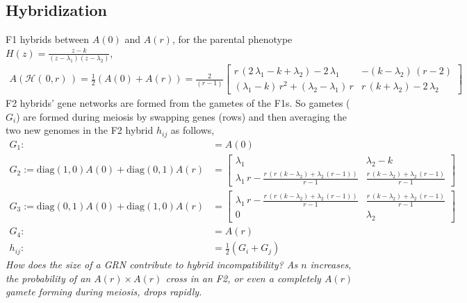 \documentclass[11 pt]{article}
\newcommand{\jss}[1]{{\color{olive}\it #1}}
\newcommand{\1}{\mathbbm{1}}
\begin{document}
      \subsection{Hybridization}
       F1 hybrids between $A(0)$ and $A(r)$, for the parental phenotype $H(z) = \displaystyle\frac{z-k}{\left(z-\lambda_{1}\right)\left(z-\lambda_{2}\right)}$,
      \begin{align*}
        A\left(\mathcal{H}(\, 0,r)\, \right) = \frac{1}{2} \left( A(0) + A(r) \right) = \frac{2}{(r-1)} \left[\begin{array}{cc} r\, \left(2\, \lambda_{1} - k + \lambda_{2}\right) - 2\, \lambda_{1} & - \left(k - \lambda_{2}\right)\, \left(r - 2\right)\\ \left(\lambda_{1} - k\right)\, r^2 + \left(\lambda_{2} - \lambda_{1}\right)\, r & r\, \left(k + \lambda_{2}\right) - 2\, \lambda_{2} \end{array}\right]
      \end{align*}
      F2 hybrids' gene networks are formed from the gametes of the F1s. So gametes ($G_{i}$) are formed during meiosis by swapping genes (rows) and then averaging the two new genomes in the F2 hybrid $h_{ij}$ as follows,
      \begin{align*}
        G_{1} :&= A(0) \\
        G_{2} := \text{diag}(1,0) A(0) + \text{diag}(0,1) A(r) &= \left[\begin{array}{cc} \lambda_{1} & \lambda_{2} - k\\ \lambda_{1}\, r - \frac{r\, \left(r\, \left(k - \lambda_{2}\right) + \lambda_{2}\, \left(r - 1\right)\right)}{r - 1} & \frac{r\, \left(k - \lambda_{2}\right) + \lambda_{2}\, \left(r - 1\right)}{r - 1} \end{array}\right] \\
          G_{3} := \text{diag}(0,1) A(0) + \text{diag}(1,0) A(r) &= \left[\begin{array}{cc} \lambda_{1}\, r - \frac{r\, \left(r\, \left(k - \lambda_{2}\right) + \lambda_{2}\, \left(r - 1\right)\right)}{r - 1} & \frac{r\, \left(k - \lambda_{2}\right) + \lambda_{2}\, \left(r - 1\right)}{r - 1}\\ 0 & \lambda_{2} \end{array}\right] \\
            G_{4} :&= A(r) \\
            h_{ij} :&= \frac{1}{2} \left( G_{i} + G_{j} \right)
      \end{align*}
      \jss{How does the size of a GRN contribute to hybrid incompatibility? As $n$ increases, the probability of an $A(r) \times A(r)$ cross in an F2, or even a completely $A(r)$ gamete forming during meiosis, drops rapidly.}
\end{document}
